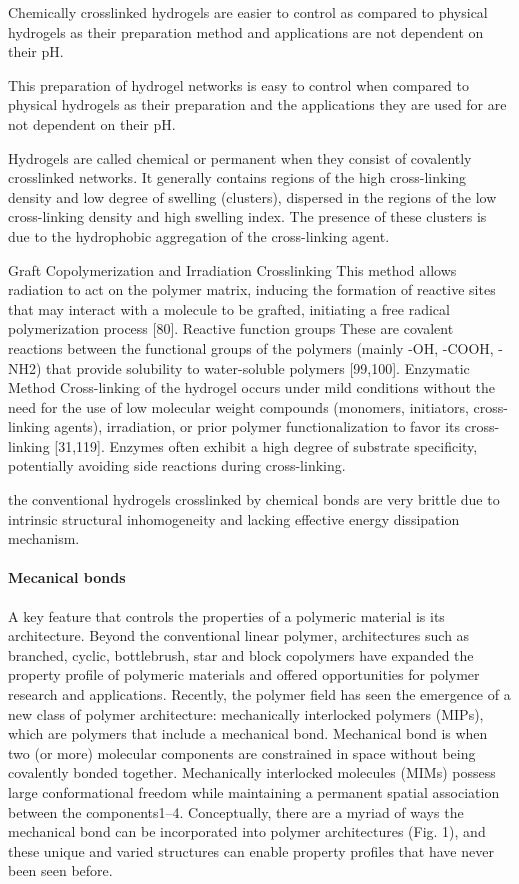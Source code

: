 Chemically crosslinked hydrogels are easier to control as compared to physical hydrogels as their preparation method and applications are not dependent on their pH.

This preparation of hydrogel networks is easy to control when compared to physical hydrogels as their preparation and the applications they are used for are not dependent on their pH. 

Hydrogels are called chemical or permanent when they consist of covalently crosslinked networks. 
It generally contains regions of the high cross-linking density and low degree of swelling (clusters), dispersed in the regions of the low cross-linking density and high swelling index. 
The presence of these clusters is due to the hydrophobic aggregation of the cross-linking agent\citep{bustamante-torresHydrogelsClassificationAccording2021}. 


Graft Copolymerization and Irradiation Crosslinking
    This method allows radiation to act on the polymer matrix, inducing the formation of reactive sites that may interact with a molecule to be grafted, initiating a free radical polymerization process [80].
Reactive function groups
    These are covalent reactions between the functional groups of the polymers (mainly -OH, -COOH, -NH2) that provide solubility to water-soluble polymers [99,100]. 
Enzymatic Method
    Cross-linking of the hydrogel occurs under mild conditions without the need for the use of low molecular weight compounds (monomers, initiators, cross-linking agents), irradiation, or prior polymer functionalization to favor its cross-linking [31,119]. Enzymes often exhibit a high degree of substrate specificity, potentially avoiding side reactions during cross-linking. 

the conventional hydrogels crosslinked by chemical bonds are very brittle due to intrinsic structural inhomogeneity and lacking effective energy dissipation mechanism\citep{xuRoleChemicalPhysical2018}.


\paragraph{Mecanical bonds}\citep{hartMaterialPropertiesApplications2021}
A key feature that controls the properties of a polymeric material is its architecture. 
Beyond the conventional linear polymer, architectures such as branched, cyclic, bottlebrush, star and block copolymers have expanded the property profile of polymeric materials and offered opportunities for polymer research and applications. 
Recently, the polymer field has seen the emergence of a new class of polymer architecture: mechanically interlocked polymers (MIPs), which are polymers that include a mechanical bond.
Mechanical bond is when two (or more) molecular components are constrained in space without being covalently bonded together.
Mechanically interlocked molecules (MIMs) possess large conformational freedom while maintaining a permanent spatial association between the components1–4. 
Conceptually, there are a myriad of ways the mechanical bond can be incorporated into polymer architectures (Fig. 1), and these unique and varied structures can enable property profiles that have never been seen before.


